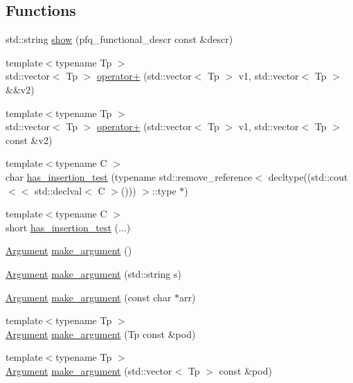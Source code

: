 \subsection*{Functions}
\begin{DoxyCompactItemize}
\item 
std\+::string \hyperlink{namespacepfq_1_1lang_a92d9597c137911206814e93dc0b8a414}{show} (pfq\+\_\+functional\+\_\+descr const \&descr)
\item 
{\footnotesize template$<$typename Tp $>$ }\\std\+::vector$<$ Tp $>$ \hyperlink{namespacepfq_1_1lang_a54f9b99ed2adf6dc2e74d21a38be3bf3}{operator+} (std\+::vector$<$ Tp $>$ v1, std\+::vector$<$ Tp $>$ \&\&v2)
\item 
{\footnotesize template$<$typename Tp $>$ }\\std\+::vector$<$ Tp $>$ \hyperlink{namespacepfq_1_1lang_ae66ee716bfcd7329fbf24620066e48e0}{operator+} (std\+::vector$<$ Tp $>$ v1, std\+::vector$<$ Tp $>$ const \&v2)
\item 
{\footnotesize template$<$typename C $>$ }\\char \hyperlink{namespacepfq_1_1lang_a9af75ca82a20815299b04bb69f1fca34}{has\+\_\+insertion\+\_\+test} (typename std\+::remove\+\_\+reference$<$ decltype((std\+::cout$<$$<$ std\+::declval$<$ C $>$())) $>$\+::type $\ast$)
\item 
{\footnotesize template$<$typename C $>$ }\\short \hyperlink{namespacepfq_1_1lang_af04e27025f4924c0d350098e2810af67}{has\+\_\+insertion\+\_\+test} (...)
\item 
\hyperlink{structpfq_1_1lang_1_1Argument}{Argument} \hyperlink{namespacepfq_1_1lang_a35dc5ee70f8418fa93584d1c00c08fa9}{make\+\_\+argument} ()
\item 
\hyperlink{structpfq_1_1lang_1_1Argument}{Argument} \hyperlink{namespacepfq_1_1lang_adeb6fd10ac0ff87d0fa320eae5c3c0e7}{make\+\_\+argument} (std\+::string s)
\item 
\hyperlink{structpfq_1_1lang_1_1Argument}{Argument} \hyperlink{namespacepfq_1_1lang_aeba8e44a2b64d0ed9242ab7e7b955262}{make\+\_\+argument} (const char $\ast$arr)
\item 
{\footnotesize template$<$typename Tp $>$ }\\\hyperlink{structpfq_1_1lang_1_1Argument}{Argument} \hyperlink{namespacepfq_1_1lang_a06c5e8c76af98792eb9a4234c24506dd}{make\+\_\+argument} (Tp const \&pod)
\item 
{\footnotesize template$<$typename Tp $>$ }\\\hyperlink{structpfq_1_1lang_1_1Argument}{Argument} \hyperlink{namespacepfq_1_1lang_a1543c06cf527cb69eb4953329c06e244}{make\+\_\+argument} (std\+::vector$<$ Tp $>$ const \&pod)
$$
\end{DoxyCompactItemize}
